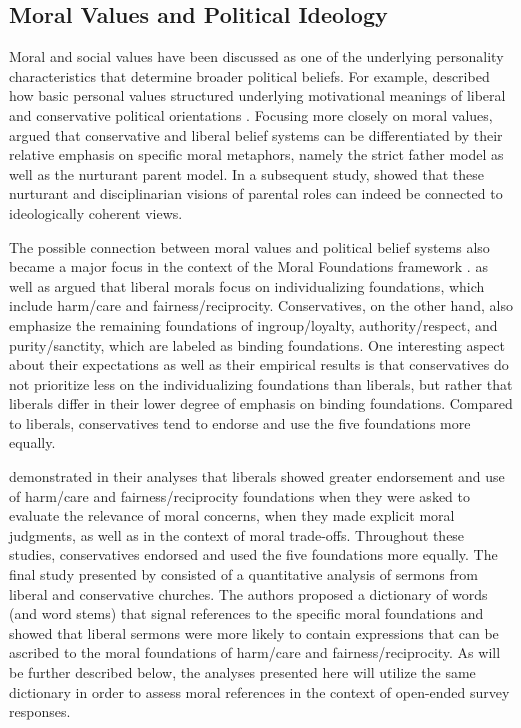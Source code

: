 \documentclass[12pt]{article}
\begin{document}
\subsection{Moral Values and Political Ideology}

Moral and social values have been discussed as one of the underlying personality characteristics that determine broader political beliefs. For example, \citet{piurko2011basic} described how basic personal values structured underlying motivational meanings of liberal and conservative political orientations \citep[see also][]{schwartz2010basic,schwartz2011basic}. Focusing more closely on moral values, \citet{lakoff1995metaphor} argued that conservative and liberal belief systems can be differentiated by their relative emphasis on specific moral metaphors, namely the strict father model as well as the nurturant parent model. In a subsequent study, \citet{barker2006competing} showed that these nurturant and disciplinarian visions of parental roles can indeed be connected to ideologically coherent views.

The possible connection between moral values and political belief systems also became a major focus in the context of the Moral Foundations framework \citep[c.f.][]{haidt2012righteous}. \citet{haidt2007morality} as well as \citet{graham2009liberals} argued that liberal morals focus on individualizing foundations, which include harm/care and fairness/reciprocity. Conservatives, on the other hand, also emphasize the remaining foundations of ingroup/loyalty, authority/respect, and purity/sanctity, which are labeled as binding foundations. One interesting aspect about their expectations as well as their empirical results is that conservatives do not prioritize less on the individualizing foundations than liberals, but rather that liberals differ in their lower degree of emphasis on binding foundations. Compared to liberals, conservatives tend to endorse and use the five foundations more equally.

\citet{graham2009liberals} demonstrated in their analyses that liberals showed greater endorsement and use of harm/care and fairness/reciprocity foundations when they were asked to evaluate the relevance of moral concerns, when they made explicit moral judgments, as well as in the context of moral trade-offs. Throughout these studies, conservatives endorsed and used the five foundations more equally. The final study presented by \citet{graham2009liberals} consisted of a quantitative analysis of sermons from liberal and conservative churches. The authors proposed a dictionary of words (and word stems) that signal references to the specific moral foundations and showed that liberal sermons were more likely to contain expressions that can be ascribed to the moral foundations of harm/care and fairness/reciprocity. As will be further described below, the analyses presented here will utilize the same dictionary in order to assess moral references in the context of open-ended survey responses.
\end{document}
